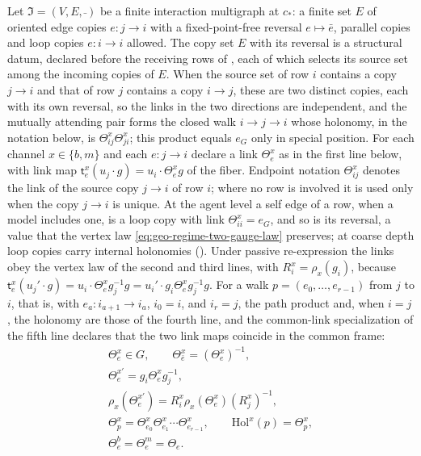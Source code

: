 Let $\mathfrak I=(V,E,\bar{\ })$ be a finite interaction multigraph at $c_*$: a finite set $E$ of
oriented edge copies $e:j\to i$ with a fixed-point-free reversal $e\mapsto\bar e$, parallel copies
and loop copies $e:i\to i$ allowed. The copy set $E$ with its reversal is a structural datum, declared
before the receiving rows of , each of which selects its source set
among the incoming copies of $E$. When the source set of row $i$ contains a copy $j\to i$ and that of
row $j$ contains a copy $i\to j$, these are two distinct copies, each with its own reversal, so the
links in the two directions are independent, and the mutually attending pair forms the closed walk
$i\to j\to i$ whose holonomy, in the notation below, is $\Theta_{ij}^x\Theta_{ji}^x$; this product
equals $e_G$ only in special position. For each channel $x\in\{b,m\}$ and each $e:j\to i$ declare a
link $\Theta_e^x$ as in the first line below, with link map $\mathsf t_e^x(u_j\cdot g)=u_i\cdot\Theta_e^xg$
of the fiber. Endpoint notation $\Theta_{ij}^x$ denotes the link of the source copy $j\to i$ of row
$i$; where no row is involved it is used only when the copy $j\to i$ is unique. At the agent level a
self edge of a row, when a model includes one, is a loop copy with link $\Theta_{ii}^x=e_G$, and so is
its reversal, a value that the vertex law \eqref{eq:geo-regime-two-gauge-law} preserves; at coarse depth loop copies carry internal holonomies
(). Under passive re-expression the
links obey the vertex law of the second and third lines, with $R_i^x=\rho_x(g_i)$, because
$\mathsf t_e^x(u_j'\cdot g)=u_i\cdot\Theta_e^xg_j^{-1}g=u_i'\cdot g_i\Theta_e^xg_j^{-1}g$. For a walk
$p=(e_0,\ldots,e_{r-1})$ from $j$ to $i$, that is, with $e_a:i_{a+1}\to i_a$, $i_0=i$, and $i_r=j$, the
path product and, when $i=j$, the holonomy are those of the fourth line, and the common-link
specialization of the fifth line declares that the two link maps coincide in the common frame:
\begin{gather}
\Theta_e^x\in G,
\qquad
\Theta_{\bar e}^x=(\Theta_e^x)^{-1},
\label{eq:geo-regime-two-links}\\
\Theta_e^{x\prime}=g_i\Theta_e^xg_j^{-1},
\label{eq:geo-regime-two-gauge-law}\\
\rho_x(\Theta_e^{x\prime})=R_i^x\rho_x(\Theta_e^x)(R_j^x)^{-1},
\label{eq:gen-represented-gauge-links}\\
\Theta_p^x=\Theta_{e_0}^x\Theta_{e_1}^x\cdots\Theta_{e_{r-1}}^x,
\qquad
\mathrm{Hol}^x(p)=\Theta_p^x,
\label{eq:geo-link-holonomy}\\
\Theta_e^b=\Theta_e^m=\Theta_e.
\label{eq:geo-common-link}
\end{gather}

